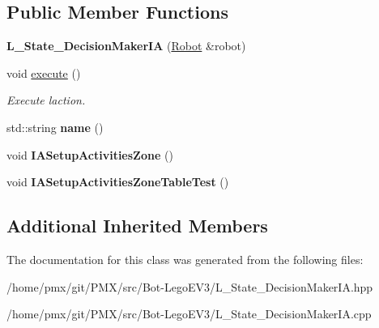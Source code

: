 \subsection*{Public Member Functions}
\begin{DoxyCompactItemize}
\item 
\mbox{\label{classL__State__DecisionMakerIA_a6eb14fdfff839c19ce59fe5699738569}} 
{\bfseries L\+\_\+\+State\+\_\+\+Decision\+Maker\+IA} (\hyperlink{classRobot}{Robot} \&robot)
\item 
\mbox{\label{classL__State__DecisionMakerIA_a93f6b28e18d7bf31eb492cac0da39fac}} 
void \hyperlink{classL__State__DecisionMakerIA_a93f6b28e18d7bf31eb492cac0da39fac}{execute} ()
\begin{DoxyCompactList}\small\item\em Execute l\textquotesingle{}action. \end{DoxyCompactList}\item 
\mbox{\label{classL__State__DecisionMakerIA_a74d5129644b561fcb0f363ddfa00bc01}} 
std\+::string {\bfseries name} ()
\item 
\mbox{\label{classL__State__DecisionMakerIA_a0169da897db938ad8af8c4b561605e5e}} 
void {\bfseries I\+A\+Setup\+Activities\+Zone} ()
\item 
\mbox{\label{classL__State__DecisionMakerIA_ad89fa9784bdb3bf83760cd4877a64bac}} 
void {\bfseries I\+A\+Setup\+Activities\+Zone\+Table\+Test} ()
\end{DoxyCompactItemize}
\subsection*{Additional Inherited Members}


The documentation for this class was generated from the following files\+:\begin{DoxyCompactItemize}
\item 
/home/pmx/git/\+P\+M\+X/src/\+Bot-\/\+Lego\+E\+V3/L\+\_\+\+State\+\_\+\+Decision\+Maker\+I\+A.\+hpp\item 
/home/pmx/git/\+P\+M\+X/src/\+Bot-\/\+Lego\+E\+V3/L\+\_\+\+State\+\_\+\+Decision\+Maker\+I\+A.\+cpp\end{DoxyCompactItemize}

